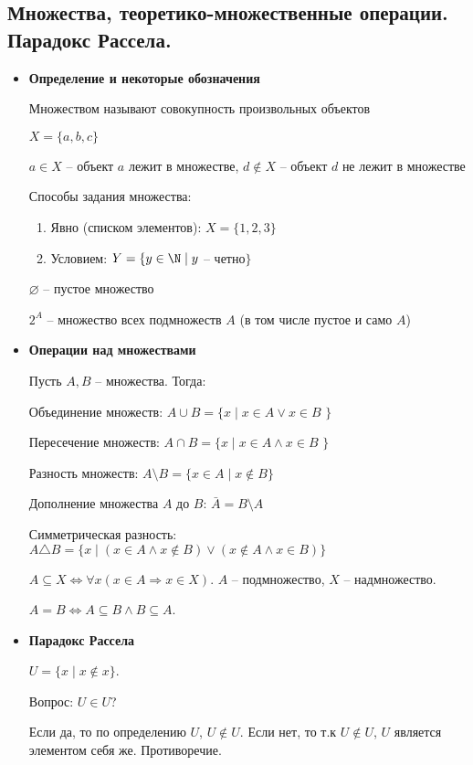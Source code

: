 \subsection{Множества, теоретико-множественные операции. Парадокс Рассела.}
\begin{itemize}
	\item \textbf{Определение и некоторые обозначения}
	
Множеством называют совокупность произвольных объектов

$X = \{a, b, c\}$

$a \in X$ -- объект $a$ лежит в множестве, $d \notin X$ -- объект $d$ не лежит в множестве

Способы задания множества:
\begin{enumerate}
	\item Явно (списком элементов): $X = \{1, 2, 3\}$
	\item Условием: $Y = \{ y \in \N \mid y$ -- четно$\}$
\end{enumerate}

$\varnothing$ -- пустое множество

$2^{A}$ -- множество всех подмножеств $A$ (в том числе пустое и само $A$)

\item \textbf{Операции над множествами}

Пусть $A, B$ -- множества. Тогда:

Объединение множеств: $A \cup B = \{x \mid x \in A \vee x \in B$ $\}$

Пересечение множеств: $A \cap B = \{x \mid x \in A \wedge x \in B$ $\}$

Разность множеств: $A \setminus B = \{x \in A \mid x \notin B \}$

Дополнение множества $A$ до $B$: $\bar{A} = B \setminus A$

Симметрическая разность: $A \triangle B = \{x \mid (x \in A \wedge x \notin B) \vee (x \notin A \wedge x \in B) \}$

$A \subseteq X \Leftrightarrow \forall x (x \in A \Rightarrow x \in X)$. $A$ -- подмножество, $X$ -- надмножество.

$A = B \Leftrightarrow A \subseteq B \wedge B \subseteq A$.

\item \textbf{Парадокс Рассела}

$U = \{x \mid x \notin x\}$.

Вопрос: $U \in U$?

Если да, то по определению $U$, $U \notin U$. Если нет, то т.к $U \notin U$, $U$ является элементом себя же. Противоречие. 

\end{itemize}